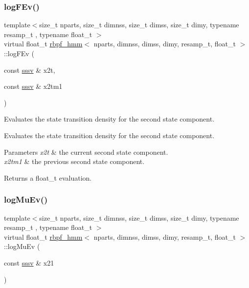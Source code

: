 \subsubsection{\texorpdfstring{log\+F\+Ev()}{logFEv()}}
{\footnotesize\ttfamily template$<$size\+\_\+t nparts, size\+\_\+t dimnss, size\+\_\+t dimss, size\+\_\+t dimy, typename resamp\+\_\+t , typename float\+\_\+t $>$ \\
virtual float\+\_\+t \hyperlink{classrbpf__hmm}{rbpf\+\_\+hmm}$<$ nparts, dimnss, dimss, dimy, resamp\+\_\+t, float\+\_\+t $>$\+::log\+F\+Ev (\begin{DoxyParamCaption}\item[{const \hyperlink{classrbpf__hmm_a28e8ad1d93bcf53cb74603f74826a81c}{sssv} \&}]{x2t,  }\item[{const \hyperlink{classrbpf__hmm_a28e8ad1d93bcf53cb74603f74826a81c}{sssv} \&}]{x2tm1 }\end{DoxyParamCaption})\hspace{0.3cm}{\ttfamily [pure virtual]}}



Evaluates the state transition density for the second state component. 

Evaluates the state transition density for the second state component. 
\begin{DoxyParams}{Parameters}
{\em x2t} & the current second state component. \\
\hline
{\em x2tm1} & the previous second state component. \\
\hline
\end{DoxyParams}
\begin{DoxyReturn}{Returns}
a float\+\_\+t evaluation. 
\end{DoxyReturn}
\mbox{\label{classrbpf__hmm_af744e8a4961b5b51b7aea6ce515e0780}} 
\subsubsection{\texorpdfstring{log\+Mu\+Ev()}{logMuEv()}}
{\footnotesize\ttfamily template$<$size\+\_\+t nparts, size\+\_\+t dimnss, size\+\_\+t dimss, size\+\_\+t dimy, typename resamp\+\_\+t , typename float\+\_\+t $>$ \\
virtual float\+\_\+t \hyperlink{classrbpf__hmm}{rbpf\+\_\+hmm}$<$ nparts, dimnss, dimss, dimy, resamp\+\_\+t, float\+\_\+t $>$\+::log\+Mu\+Ev (\begin{DoxyParamCaption}\item[{const \hyperlink{classrbpf__hmm_a28e8ad1d93bcf53cb74603f74826a81c}{sssv} \&}]{x21 }\end{DoxyParamCaption})\hspace{0.3cm}{\ttfamily [pure virtual]}}



